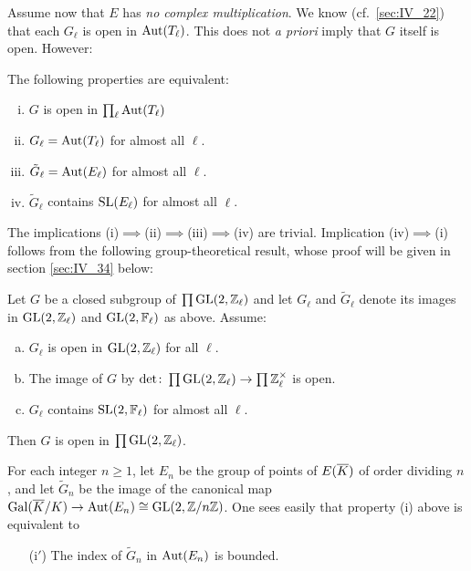 Assume now that $E$ has \emph{no complex multiplication}. We know (cf.\
\ref{sec:IV_22}) that each $G_\ell$ is open in $\operatorname{Aut}(T_\ell)$. This does not
\emph{a priori} imply that $G$ itself is open. However:

\begin{prop}
The following properties are equivalent:
\begin{enumerate}[(i)]
	\item $G$ is open in $\prod_\ell \operatorname{Aut}(T_\ell)$
	\item $G_\ell = \operatorname{Aut}(T_\ell)$ for almost all $\ell$.
	\item $\tilde{G}_\ell = \operatorname{Aut}(E_\ell)$ for almost all $\ell$.
	\item $\tilde{G}_\ell$ contains $\operatorname{SL}(E_\ell)$ for almost all $\ell$.
\end{enumerate}
\end{prop}

The implications (i)$\implies$(ii)$\implies$(iii)$\implies$(iv) are trivial.
Implication (iv)$\implies$(i) follows from the following group-theoretical
result, whose proof will be given in section \ref{sec:IV_34} below:

\begin{lem}\label{lem:IV_31_main}
Let $G$ be a closed subgroup of $\prod \operatorname{GL}(2, \mathbb{Z}_\ell)$ and 
let $G_\ell$ and $\tilde{G}_\ell$ denote its images in $\operatorname{GL}(2, \mathbb{Z}_\ell)$ and
$\operatorname{GL}(2, \mathbb{F}_\ell)$ as above. Assume:
\begin{enumerate}[(a)]
	\item\label{lem:IV_31_main_a}
		$G_\ell$ is open in $\operatorname{GL}(2, \mathbb{Z}_\ell)$ for all $\ell$.
	\item\label{lem:IV_31_main_b}
		The image of $G$ by $\det \colon \prod \operatorname{GL}(2, \mathbb{Z}_\ell) \to \prod
\mathbb{Z}^\times_\ell$ is open.
	\item\label{lem:IV_31_main_c}
		$G_\ell$ contains $\operatorname{SL}(2,\mathbb{F}_\ell)$ for almost all $\ell$.
\end{enumerate}
Then $G$ is open in $\prod \operatorname{GL}(2, \mathbb{Z}_\ell)$.
\end{lem}

\begin{obs}
For each integer $n \geq 1$, let $E_n$ be the group of points of $E(\overline{K})$
of order dividing $n$, and let $\tilde{G}_n$ be the image of the canonical map
$\operatorname{Gal}(\overline{K}/K) \to \operatorname{Aut}(E_n) \cong \operatorname{GL}(2, \mathbb{Z} / n\mathbb{Z})$.
One sees easily that property (i) above is equivalent to 
\begin{enumerate}
	\item[(i$'$)] The index of $\tilde{G}_n$ in $\operatorname{Aut}(E_n)$ is bounded.
\end{enumerate}
\end{obs}

